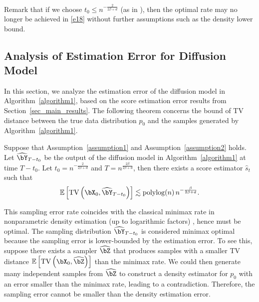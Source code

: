 Remark that if we choose $t_0\le n^{-\frac{2}{2\beta+d}}$ (as in \cite{oko2023diffusion}),
then the optimal rate may no longer be achieved in \eqref{e18} without further assumptions such as the density lower bound.



\subsection{Analysis of Estimation Error for Diffusion Model}\label{sec_TV_results}
In this section, we analyze the estimation error of the diffusion model in Algorithm~\ref{algorithm1}, based on the score estimation error results from Section~\ref{sec_main_results}. The following theorem concerns the bound of TV distance between the true data distribution $p_0$ and the samples generated by Algorithm~\ref{algorithm1}.
\begin{theorem}\label{main_theorem2}
    Suppose that Assumption~\ref{assumption1} and Assumption~\ref{assumption2} holds. Let $\widehat \bY_{T-t_0}$ be the output of the diffusion model in Algorithm~\ref{algorithm1} at time $T-t_0$. Let $t_0 = n^{-\frac{2}{2\beta+d}}$ and $T = n^{\frac{2\beta}{2\beta+d}}$, then there exists a score estimator $\hat s_t$ such that
    \begin{equation}
    \mathbb{E}\left[\mathrm{TV}\left(\bX_0, \widehat \bY_{T-t_0}\right)\right] \lesssim \mathrm{polylog}(n) \, n^{-\frac{\beta}{2\beta+d}}.
    \end{equation}
\end{theorem}

\begin{remark}
    This sampling error rate coincides with the classical minimax rate in nonparametric density estimation (up to logarithmic factors)
\citep{stone1980optimal,stone1982optimal,tsybakov}, hence must be optimal. The sampling distribution $\widehat \bY_{T-t_0}$ is considered minimax optimal because the sampling error is lower-bounded by the estimation error. To see this, suppose there exists a sampler $\widehat \bZ$ that produces samples with a smaller TV distance $\mathbb{E}\left[\mathrm{TV}\left(\bX_0, \widehat \bZ\right)\right]$ than the minimax rate. We could then generate many independent samples from $\widehat \bZ$ to construct a density estimator for $p_0$ with an error smaller than the minimax rate, leading to a contradiction. Therefore, the sampling error cannot be smaller than the density estimation error.
\end{remark}

